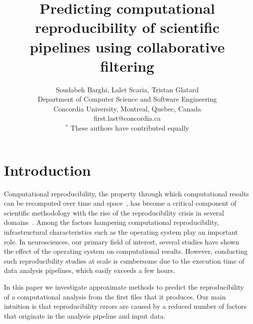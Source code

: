 \documentclass[10pt, conference, compsocconf]{IEEEtran}
\begin{document}
\title{Predicting computational reproducibility of scientific pipelines using collaborative filtering}

\author{Soudabeh Barghi, Lalet Scaria, Tristan Glatard\\
  Department of Computer Science and Software Engineering\\ Concordia University, Montreal, Quebec, Canada\\
  {first.last}@concordia.ca\\
  $^*$ These authors have contributed equally
}

\maketitle

\begin{abstract}
\end{abstract}


\section{Introduction}

Computational reproducibility, the property through which
computational results can be recomputed over time and
space~\cite{stodden}, has become a critical component of scientific
methodology with the rise of the reproducibility crisis in several
domains~\cite{xxx}. Among the factors hampering computational
reproducibility, infrastructural characteristics such as the operating
system play an important role. In neurosciences, our primary field of
interest, several studies have shown the effect of the operating
system on computational results. However, conducting such
reproducibility studies at scale is cumbersome due to the execution
time of data analysis pipelines, which easily exceeds a few hours.




In this paper we investigate approximate methods to predict the
reproducibility of a computational analysis from the first files that
it produces. Our main intuition is that reproducibility errors are
caused by a reduced number of factors that originate in the analysis
pipeline and input data. 

 


\end{document}
